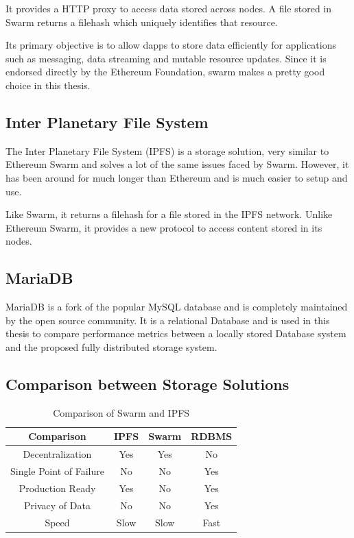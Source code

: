 \documentclass[11pt,openright]{report}
\begin{document}
It provides a HTTP proxy to access data stored across nodes. A file stored in Swarm returns a filehash which uniquely identifies that resource.

Its primary objective is to allow dapps to store data efficiently for applications such as messaging, data streaming and mutable resource updates. Since it is endorsed directly by the Ethereum Foundation, swarm makes a pretty good choice in this thesis.


\subsection{Inter Planetary File System}
The Inter Planetary File System (IPFS) is a storage solution, very similar to Ethereum Swarm and solves a lot of the same issues faced by Swarm. However, it has been around for much longer than Ethereum and is much easier to setup and use.

Like Swarm, it returns a filehash for a file stored in the IPFS network. Unlike Ethereum Swarm, it provides a new protocol to access content stored in its nodes.

\subsection{MariaDB}
MariaDB is a fork of the popular MySQL database and is completely maintained by the open source community. It is a relational Database and is used in this thesis to compare performance metrics between a locally stored Database system and the proposed fully distributed storage system.

\subsection{Comparison between Storage Solutions}
\begin{table}[!htbp]
	\renewcommand{\arraystretch}{1.3}
	\caption{Comparison of Swarm and IPFS}
	\label{swarm_eth_comparison}
	\centering
	\begin{tabular}{|c||c|c|c|}
		\hline
		\bfseries Comparison & \bfseries IPFS & \bfseries Swarm & \bfseries RDBMS \\
		\hline\hline
		Decentralization & Yes & Yes & No \\ \hline
		Single Point of Failure & No & No & Yes \\ \hline
		Production Ready & Yes & No & Yes \\ \hline
		Privacy of Data & No & No & Yes \\ \hline
		Speed & Slow & Slow & Fast \\ \hline

	\end{tabular}
\end{table}
\end{document}
